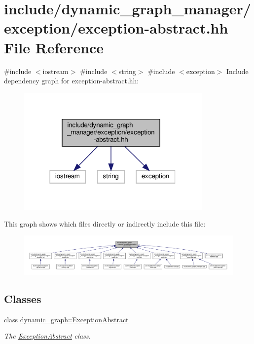 \hypertarget{exception-abstract_8hh}{}\section{include/dynamic\+\_\+graph\+\_\+manager/exception/exception-\/abstract.hh File Reference}
\label{exception-abstract_8hh}
{\ttfamily \#include $<$iostream$>$}\newline
{\ttfamily \#include $<$string$>$}\newline
{\ttfamily \#include $<$exception$>$}\newline
Include dependency graph for exception-\/abstract.hh\+:
\nopagebreak
\begin{figure}[H]
\begin{center}
\leavevmode
\includegraphics[width=271pt]{exception-abstract_8hh__incl}
\end{center}
\end{figure}
This graph shows which files directly or indirectly include this file\+:
\nopagebreak
\begin{figure}[H]
\begin{center}
\leavevmode
\includegraphics[width=350pt]{exception-abstract_8hh__dep__incl}
\end{center}
\end{figure}
\subsection*{Classes}
\begin{DoxyCompactItemize}
\item 
class \hyperlink{classdynamic__graph_1_1ExceptionAbstract}{dynamic\+\_\+graph\+::\+Exception\+Abstract}
\begin{DoxyCompactList}\small\item\em The \hyperlink{classdynamic__graph_1_1ExceptionAbstract}{Exception\+Abstract} class. \end{DoxyCompactList}\end{DoxyCompactItemize}

